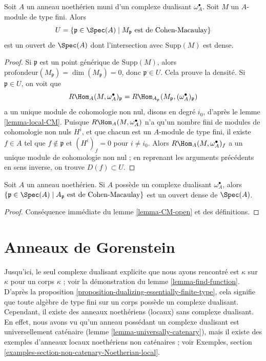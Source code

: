 \begin{lemma}
\label{lemma-CM-open}
Soit $A$ un anneau noethérien muni d'un complexe dualisant $\omega_A^\bullet$.
Soit $M$ un $A$-module de type fini. Alors
$$
U = \{\mathfrak p \in \Spec(A) \mid M_\mathfrak p\text{ est de Cohen-Macaulay}\}
$$
est un ouvert de $\Spec(A)$ dont l'intersection avec $\text{Supp}(M)$ est dense.
\end{lemma}

\begin{proof}
Si $\mathfrak p$ est un point générique de $\text{Supp}(M)$, alors $\text{profondeur}(M_\mathfrak p) = \dim(M_\mathfrak p) = 0$,
donc $\mathfrak p \in U$. Cela prouve la densité.
Si $\mathfrak p \in U$, on voit que
$$
R\Hom_A(M, \omega_A^\bullet)_\mathfrak p =
R\Hom_{A_\mathfrak p}(M_\mathfrak p, (\omega_A^\bullet)_\mathfrak p)
$$
a un unique module de cohomologie non nul, disons en degré $i_0$,
d'après le lemme \ref{lemma-local-CM}.
Puisque $R\Hom_A(M, \omega_A^\bullet)$ n'a qu'un nombre fini de modules de cohomologie non nuls $H^i$,
et que chacun est un $A$-module de type fini,
il existe $f \in A$ tel que $f \not \in \mathfrak p$ et $(H^i)_f = 0$ pour $i \not = i_0$.
Alors $R\Hom_A(M, \omega_A^\bullet)_f$ a un unique module de cohomologie non nul ;
en reprenant les arguments précédents en sens inverse, on trouve $D(f) \subset U$.
\end{proof}

\begin{lemma}
\label{lemma-CM}
Soit $A$ un anneau noethérien. Si $A$ possède un complexe dualisant $\omega_A^\bullet$, alors
$\{\mathfrak p \in \Spec(A) \mid A_\mathfrak p\text{ est de Cohen-Macaulay}\}$
est un ouvert dense de $\Spec(A)$.
\end{lemma}

\begin{proof}
Conséquence immédiate du lemme \ref{lemma-CM-open} et des définitions.
\end{proof}






\section{Anneaux de Gorenstein}
\label{section-gorenstein}

\noindent
Jusqu'ici, le seul complexe dualisant explicite que nous ayons rencontré
est $\kappa$ sur $\kappa$ pour un corps $\kappa$ ; voir la démonstration du lemme \ref{lemma-find-function}.
D'après la proposition \ref{proposition-dualizing-essentially-finite-type}, cela signifie que toute algèbre de type fini
sur un corps possède un complexe dualisant.
Cependant, il existe des anneaux noethériens (locaux) sans complexe dualisant.
En effet, nous avons vu qu'un anneau possédant un complexe dualisant
est universellement caténaire (lemme \ref{lemma-universally-catenary}),
mais il existe des exemples d'anneaux locaux noethériens non caténaires ;
voir Exemples, section \ref{examples-section-non-catenary-Noetherian-local}.

